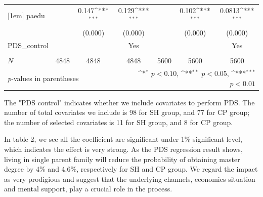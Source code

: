 \documentclass[]{AEA}
\def\sym#1{\ifmmode^{#1}\else\(^{#1}\)\fi}
\begin{document}
\begin{center}
\begin{table}
\begin{tabular}{l*{6}c}
    [1em]
    paedu       &                     &       0.147\sym{***}&       0.129\sym{***}&                     &       0.102\sym{***}&      0.0813\sym{***}\\
            &                     &     (0.000)         &     (0.000)         &                     &     (0.000)         &     (0.000)         \\
    [1em]
    PDS\_control  &   &  &  Yes    &  &    &  Yes \\
    &   &      &      &   &      &      \\
    \hline
    \(N\)       &        4848         &        4848         &        4848         &        5600         &        5600         &        5600         \\
    \bottomrule
    \multicolumn{3}{l}{\footnotesize \textit{p}-values in parentheses} & \multicolumn{4}{r}{\footnotesize \sym{*} \(p<0.10\), \sym{**} \(p<0.05\), \sym{***} \(p<0.01\)}\\
    \end{tabular}
    \begin{tablenotes}
        The "PDS control" indicates whether we include covariates to perform PDS.  The number of total covariates we include is 98 for SH group, and 77 for CP group; the number of selected covariates is 11 for SH group, and 8 for CP group.
    \end{tablenotes}
    \end{table}
    \end{center}

    In table 2, we see all the coefficient are significant under 1\% significant level, which indicates the effect is very strong.  As the PDS regression result shows, living in single parent family will reduce the probability of obtaining master degree by 4\% and 4.6\%, respectively for SH and CP group.  We regard the impact as very prodigious and suggest that the underlying channels, economics situation and mental support, play a crucial role in the process.
\end{document}
